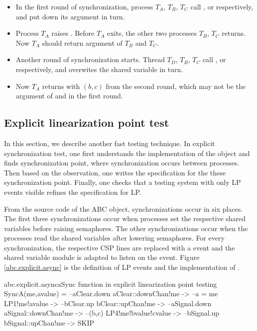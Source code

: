 \documentclass[a4paper, 12pt]{article}
\begin{document}

\begin{itemize}
  \item In the first round of synchronization, process $T_A$, $T_B$, $T_C$ call ,  or  respectively, and put down its argument in turn.
  \item Process $T_A$ raises . Before $T_A$ exits, the other two processes $T_B$, $T_C$ returns. Now $T_A$ should return argument of $T_B$ and $T_C$.
  \item Another round of synchronization starts. Thread $T_D$, $T_B$, $T_C$ call ,  or  respectively, and overwites the shared variable  in turn.
  \item Now $T_A$ returns with $(b,c)$ from the second round, which may not be the argument of  and  in the first round.
\end{itemize}

\subsection{Explicit linearization point test}
In this section, we describe another fast testing technique. In explicit synchronization test, one first understands the implementation of the object and finds synchronization point, where synchronization occurs between processes. Then based on the observation, one writes the specification for the these synchronization point. Finally, one checks that a testing system with only LP events visible refines the specification for LP.

From the source code of the ABC object, synchronizations occur in six places. The first three synchronizations occur when processes set the respective shared variables before raising semaphores. The other synchronizations occur when the processes read the shared variables after lowering semaphores. For every synchronization, the respective CSP lines are replaced with a  event and the shared variable module is adapted to listen on the  event. Figure \ref{abc.explicit.async} is the definition of LP events and the implementation of . 
\begin{cspfloat}{abc.explicit.async}{aSync function in explicit linearization point testing}
SyncA(me,avalue) =
  --aClear.down
  aClear::downChan!me ->
  --a = me
  LP1!me!avalue ->
  --bClear.up
  bClear::upChan!me ->
  --aSignal.down
  aSignal::downChan!me ->
  --(b,c)
  LP4!me!bvalue!cvalue ->
  --bSignal.up
  bSignal::upChan!me ->
  SKIP
\end{cspfloat}
\end{document}
